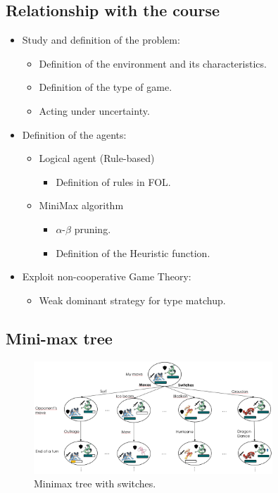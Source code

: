 \subsection{Relationship with the course}\label{appendix:course_relationship}
\begin{itemize}
    \item Study and definition of the problem:
    \begin{itemize}
        \item Definition of the environment and its characteristics.
        \item Definition of the type of game.
        \item Acting under uncertainty.
    \end{itemize}
    \item Definition of the agents:
    \begin{itemize}
        \item Logical agent (Rule-based)
            \begin{itemize}
            \item Definition of rules in FOL.
            \end{itemize}
        \item MiniMax algorithm
            \begin{itemize}
            \item $\alpha$-$\beta$ pruning.
            \item Definition of the Heuristic function.
            \end{itemize}
    \end{itemize}
    \item Exploit non-cooperative Game Theory:
    \begin{itemize}
        \item Weak dominant strategy for type matchup.
    \end{itemize}
    
\end{itemize}

\subsection{Mini-max tree}
\begin{figure}[H]
    \centering
    \includegraphics[width=0.8\textwidth]{images/minimax with switches.png}
    \caption{Minimax tree with switches.}
    \label{fig:minimax_with_switches}
\end{figure}

